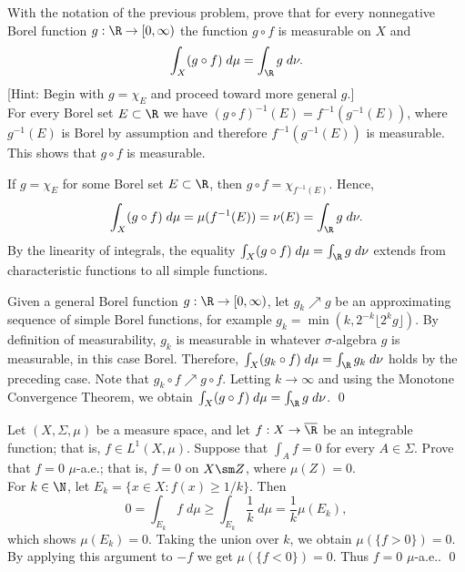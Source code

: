 \begin{hwsol}
With the notation of the previous problem, prove that for every nonnegative Borel function $g: \R  \to [0, \infty)$ the function $g \circ f$ is measurable on $X$ and
        \[
        \int_X (g \circ f) \;d\mu= \int_{\R} g \;d\nu.
        \]
[Hint: Begin with $g= \chi_E$ and proceed toward more general $g$.] \\

\pf For every Borel set $E \subset \R$ we have $(g \circ f)^{-1}(E)= f^{-1}(g^{-1}(E))$, where $g^{-1}(E)$ is Borel by assumption and therefore $f^{-1}(g^{-1}(E))$ is measurable. This shows that $g \circ f$ is measurable. 

If $g= \chi_E$ for some Borel set $E \subset \R$, then $g \circ f= \chi_{f^{-1}(E)}$. Hence, 
        \[
        \int_X (g \circ f) \;d\mu= \mu(f^{-1}(E))= \nu(E)= \int_{\R} g  \;d\nu.
        \]
By the linearity of integrals, the equality $\int_X (g \circ f) \;d\mu= \int_{\R} g \;d\nu$ extends from characteristic functions to all simple functions. 

Given a general Borel function $g: \R \to [0,\infty)$, let $g_k \nearrow g$ be an approximating sequence of simple Borel functions, for example $g_k= \min(k, 2^{-k} \lfloor 2^k g \rfloor)$. By definition of measurability, $g_k$ is measurable in whatever $\sigma$-algebra $g$ is measurable, in this case Borel. Therefore, $\int_X (g_k \circ f) \;d\mu= \int_{\R} g_k \;d\nu$ holds by the preceding case. Note that $g_k \circ f \nearrow g \circ f$.
Letting $k \to \infty$ and using the Monotone Convergence Theorem, we obtain $\int_X (g \circ f) \;d\mu= \int_{\R} g \;d\nu$. \qed \\
\end{hwsol}


\begin{hwsol}
Let $(X,\Sigma,\mu)$ be a measure space, and let $f: X \to \overline{\R}$ be an integrable function; that is, $f \in L^1(X,\mu)$. Suppose that $\int_A f= 0$ for every $A \in \Sigma$. Prove that $f= 0$ $\mu$-a.e.; that is, $f=0$ on $X \sm Z$, where $\mu(Z)=0$. \\

\pf For $k  \in \N$, let $E_k= \{ x \in X \colon f(x) \geq 1/k  \}$. Then 
        \[
        0= \int_{E_k} f \;d\mu \geq \int_{E_k} \dfrac{1}{k} \;d\mu=  \dfrac{1}{k} \mu(E_k),
        \]
which shows $\mu(E_k)= 0$. Taking the union over $k$, we obtain $\mu(\{ f  > 0 \})= 0$. By applying this argument to $-f$ we get $\mu(\{ f < 0 \})= 0$. Thus $f= 0$ $\mu$-a.e.. \qed \\
\end{hwsol}
 

